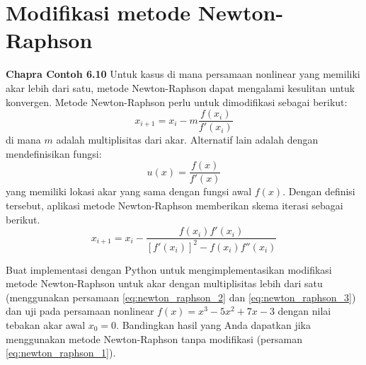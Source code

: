 \section{Modifikasi metode Newton-Raphson}

\textbf{Chapra Contoh 6.10}
Untuk kasus di mana persamaan nonlinear yang memiliki akar
lebih dari satu, metode Newton-Raphson dapat mengalami kesulitan
untuk konvergen. Metode Newton-Raphson perlu untuk dimodifikasi
sebagai berikut:
\begin{equation}
x_{i+1} = x_{i} - m\frac{f(x_{i})}{f'(x_{i})}
\label{eq:newton_raphson_2}
\end{equation}
di mana $m$ adalah multiplisitas dari akar.
Alternatif lain adalah dengan mendefinisikan fungsi:
\begin{equation*}
u(x) = \frac{f(x)}{f'(x)}
\end{equation*}
yang memiliki lokasi akar yang sama dengan fungsi awal $f(x)$.
Dengan definisi tersebut, aplikasi metode Newton-Raphson memberikan skema
iterasi sebagai berikut.
\begin{equation}
x_{i+1} = x_{i} - \frac{f(x_{i}) f'(x_{i})}{[f'(x_{i})]^{2} - f(x_{i})f''(x_{i})}
\label{eq:newton_raphson_3}
\end{equation}

\begin{soal}
Buat implementasi dengan Python untuk mengimplementasikan modifikasi metode
Newton-Raphson untuk akar dengan multiplisitas lebih dari satu
(menggunakan persamaan \eqref{eq:newton_raphson_2} dan \eqref{eq:newton_raphson_3})
dan uji pada persamaan nonlinear $f(x) = x^3 - 5x^2 + 7x - 3$ dengan nilai tebakan akar
awal $x_{0} = 0$. Bandingkan hasil yang Anda dapatkan jika menggunakan metode
Newton-Raphson tanpa modifikasi (persaman \eqref{eq:newton_raphson_1}).
\end{soal}